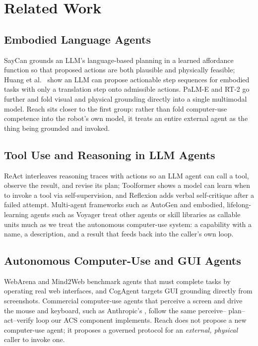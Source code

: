 \documentclass[conference]{IEEEtran}
\begin{document}
\section{Related Work}
\subsection{Embodied Language Agents}
\label{sec:embodied-agents}
SayCan \cite{ahn2022saycan} grounds an LLM's language-based planning in a learned affordance function so that proposed
actions are both plausible and physically feasible; Huang et al.\ \cite{huang2022zeroshot} show an LLM can propose actionable step
sequences for embodied tasks with only a translation step onto admissible actions. PaLM-E \cite{driess2023palme} and RT-2 \cite{brohan2023rt2}
go further and fold visual and physical grounding directly into a single multimodal model. Reach sits closer
to the first group: rather than fold computer-use competence into the robot's own model, it treats an entire
external agent as the thing being grounded and invoked.

\subsection{Tool Use and Reasoning in LLM Agents}
ReAct \cite{yao2023react} interleaves reasoning traces with actions so an LLM agent can call a tool, observe the result,
and revise its plan; Toolformer \cite{schick2023toolformer} shows a model can learn when to invoke a tool via self-supervision, and
Reflexion \cite{shinn2023reflexion} adds verbal self-critique after a failed attempt. Multi-agent frameworks such as AutoGen \cite{wu2023autogen}
and embodied, lifelong-learning agents such as Voyager \cite{wang2023voyager} treat other agents or skill libraries as callable
units much as we treat the autonomous computer-use system: a capability with a name, a description, and
a result that feeds back into the caller's own loop.

\subsection{Autonomous Computer-Use and GUI Agents}
WebArena \cite{zhou2024webarena} and Mind2Web \cite{deng2023mind2web} benchmark agents that must complete tasks by operating real web interfaces,
and CogAgent \cite{hong2024cogagent} targets GUI grounding directly from screenshots. Commercial computer-use agents that
perceive a screen and drive the mouse and keyboard, such as Anthropic's \cite{anthropic2024computeruse}, follow the same perceive--
plan--act--verify loop our ACS component implements. Reach does not propose a new computer-use agent;
it proposes a governed protocol for an \emph{external, physical} caller to invoke one.
\end{document}
